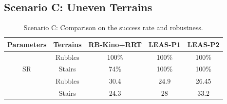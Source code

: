 \subsection{Scenario C: Uneven Terrains}
\begin{table}[h]
\centering
\caption{Scenario C: Comparison on the success rate and robustness. \label{tab:SBCP:rubbles_robustness}}
\begin{tabular}{ |c|c|c|c|c| }
    \hline
    Parameters & Terrains & RB-Kino+RRT & LEAS-P1 & LEAS-P2\\
    \hline \hline
    \multirow{3}{*}{SR} & Rubbles & 100\% & 100\% & 100\% \\
    \cline{2-5}
                        & Stairs & 74\% & 100\% & 100\% \\
    \hline \hline
    \multirow{3}{*}{Robustness} & Rubbles & 30.4 & 24.9 & 26.45 \\
    \cline{2-5}
                                & Stairs  & 24.3 & 28 & 33.2 \\
    \hline
\end{tabular}
\label{tab:cp-sb:rubbles_stairs}
\end{table}
